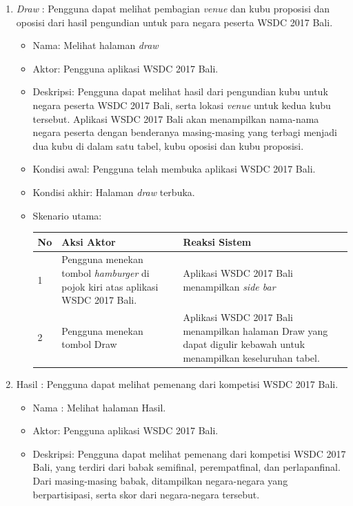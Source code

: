 \begin{enumerate}
\begin{itemize}
	\end{itemize}
	\item {\it Draw} : Pengguna dapat melihat pembagian {\it venue} dan kubu proposisi dan oposisi dari hasil pengundian untuk para negara peserta WSDC 2017 Bali.
	\begin{itemize}
		\item Nama: Melihat halaman {\it draw}
		\item Aktor: Pengguna aplikasi WSDC 2017 Bali.
		\item Deskripsi: Pengguna dapat melihat hasil dari pengundian kubu untuk negara peserta WSDC 2017 Bali, serta lokasi {\it venue} untuk kedua kubu tersebut. Aplikasi WSDC 2017 Bali akan menampilkan nama-nama negara peserta dengan benderanya masing-masing yang terbagi menjadi dua kubu di dalam satu tabel, kubu oposisi dan kubu proposisi.
		\item Kondisi awal: Pengguna telah membuka aplikasi WSDC 2017 Bali.
		\item Kondisi akhir: Halaman {\it draw} terbuka.
		\item Skenario utama: \\
		\begin{table}[H]
			\centering
			\begin{tabular}{|p{0.5cm}|p{7cm}|p{7cm}|}
				\hline
				No & Aksi Aktor                               & Reaksi Sistem                                          \\ \hline
				1  & Pengguna menekan tombol {\it hamburger} di pojok kiri atas aplikasi WSDC 2017 Bali. & Aplikasi WSDC 2017 Bali menampilkan {\it side bar} \\ \hline
				2  & Pengguna menekan tombol Draw & Aplikasi WSDC 2017 Bali menampilkan halaman Draw yang dapat digulir kebawah untuk menampilkan keseluruhan tabel. \\ \hline
			\end{tabular}
		\end{table}
	\end{itemize}
	\item Hasil : Pengguna dapat melihat pemenang dari kompetisi WSDC 2017 Bali.
	\begin{itemize}
		\item Nama : Melihat halaman Hasil.
		\item Aktor: Pengguna aplikasi WSDC 2017 Bali.
		\item Deskripsi: Pengguna dapat melihat pemenang dari kompetisi WSDC 2017 Bali, yang terdiri dari babak semifinal, perempatfinal, dan perlapanfinal. Dari masing-masing babak, ditampilkan negara-negara yang berpartisipasi, serta skor dari negara-negara tersebut. 

\end{itemize}
\end{enumerate}
